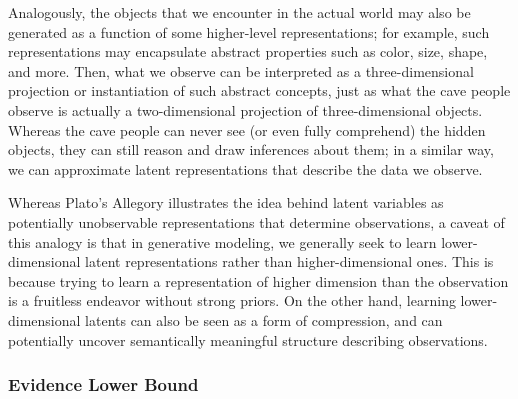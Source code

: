 Analogously, the objects that we encounter in the actual world may also be generated as a function of some higher-level representations; for example, such representations may encapsulate abstract properties such as color, size, shape, and more.  Then, what we observe can be interpreted as a three-dimensional projection or instantiation of such abstract concepts, just as what the cave people observe is actually a two-dimensional projection of three-dimensional objects.  Whereas the cave people can never see (or even fully comprehend) the hidden objects, they can still reason and draw inferences about them; in a similar way, we can approximate latent representations that describe the data we observe.

Whereas Plato’s Allegory illustrates the idea behind latent variables as potentially unobservable representations that determine observations, a caveat of this analogy is that in generative modeling, we generally seek to learn lower-dimensional latent representations rather than higher-dimensional ones.  This is because trying to learn a representation of higher dimension than the observation is a fruitless endeavor without strong priors.  On the other hand, learning lower-dimensional latents can also be seen as a form of compression, and can potentially uncover semantically meaningful structure describing observations.


\subsubsection*{Evidence Lower Bound}
%

